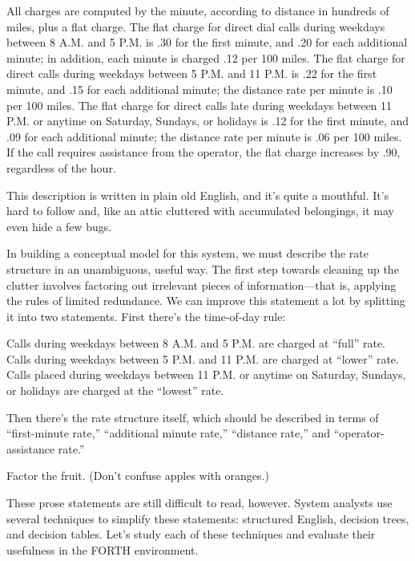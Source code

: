 \begin{tfquot}
All charges are computed by the minute, according to distance in
hundreds of miles, plus a flat charge. The flat charge for direct dial
calls during weekdays between 8 A.M. and 5 P.M. is .30 for the first
minute, and .20 for each additional minute; in addition, each minute
is charged .12 per 100 miles. The flat charge for direct calls during
weekdays between 5 P.M. and 11 P.M. is .22 for the first minute, and
.15 for each additional minute; the distance rate per minute is .10
per 100 miles. The flat charge for direct calls late during weekdays
between 11 P.M. or anytime on Saturday, Sundays, or holidays is .12
for the first minute, and .09 for each additional minute; the distance
rate per minute is .06 per 100 miles. If the call requires assistance
from the operator, the flat charge increases by .90, regardless of the hour.
\end{tfquot}
This description is written in plain old English, and it's quite a
mouthful.  It's hard to follow and, like an attic cluttered with
accumulated belongings, it may even hide a few bugs.


In building a conceptual model for this system, we must describe the
rate structure in an unambiguous, useful way. The first step towards
cleaning up the clutter involves factoring out irrelevant pieces of
information---that is, applying the rules of limited redundance. We
can improve this statement a lot by splitting it into two statements.
First there's the time-of-day rule:

\begin{tfquot}
Calls during weekdays between 8 A.M. and 5 P.M. are charged at ``full'' rate.
Calls during weekdays between 5 P.M. and 11 P.M. are charged at ``lower''
rate. Calls placed during weekdays between 11 P.M. or anytime on Saturday,
Sundays, or holidays are charged at the ``lowest'' rate.
\end{tfquot}
Then there's the rate structure itself, which should be described in
terms of ``first-minute rate,'' ``additional minute rate,'' ``distance
rate,'' and ``operator-assistance rate.''

\begin{tip}
Factor the fruit. (Don't confuse apples with oranges.)
\end{tip}
These prose statements are still difficult to read, however. System
analysts use several techniques to simplify these statements:
structured English, decision trees, and decision tables. Let's study
each of these techniques and evaluate their usefulness in the FORTH
environment.

